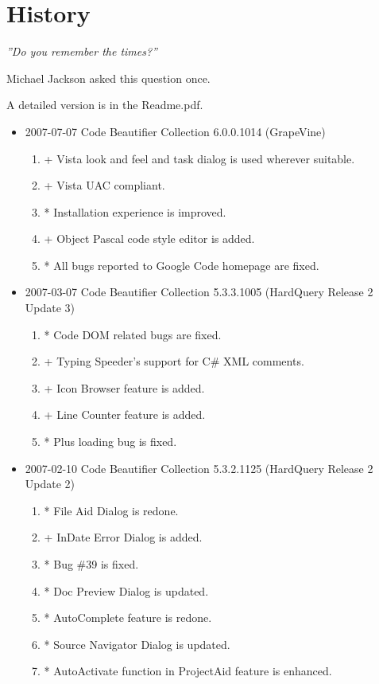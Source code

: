 \chapter{History}

\emph{''Do you remember the times?''}

Michael Jackson asked this question once.
\piccbc

\newpage
A detailed version is in the Readme.pdf.
\begin{itemize}
  \item 2007-07-07 Code Beautifier Collection 6.0.0.1014 (GrapeVine)
  \begin{enumerate}
    \item + Vista look and feel and task dialog is used wherever suitable.
    \item + Vista UAC compliant.
    \item * Installation experience is improved.
    \item + Object Pascal code style editor is added.
    \item * All bugs reported to Google Code homepage are fixed.
  \end{enumerate}
    \item 2007-03-07 Code Beautifier Collection 5.3.3.1005 (HardQuery Release 2
  Update 3)
  \begin{enumerate}
    \item * Code DOM related bugs are fixed.
    \item + Typing Speeder's support for C\# XML comments.
    \item + Icon Browser feature is added.
    \item + Line Counter feature is added.
    \item * Plus loading bug is fixed.
  \end{enumerate}
  \item 2007-02-10 Code Beautifier Collection 5.3.2.1125 (HardQuery Release 2
  Update 2)
  \begin{enumerate}
  \item * File Aid Dialog is redone.
  \item + InDate Error Dialog is added.
  \item * Bug \#39 is fixed.
  \item * Doc Preview Dialog is updated.
  \item * AutoComplete feature is redone.
  \item * Source Navigator Dialog is updated.
  \item * AutoActivate function in ProjectAid feature is enhanced.

\end{enumerate}
\end{itemize}
